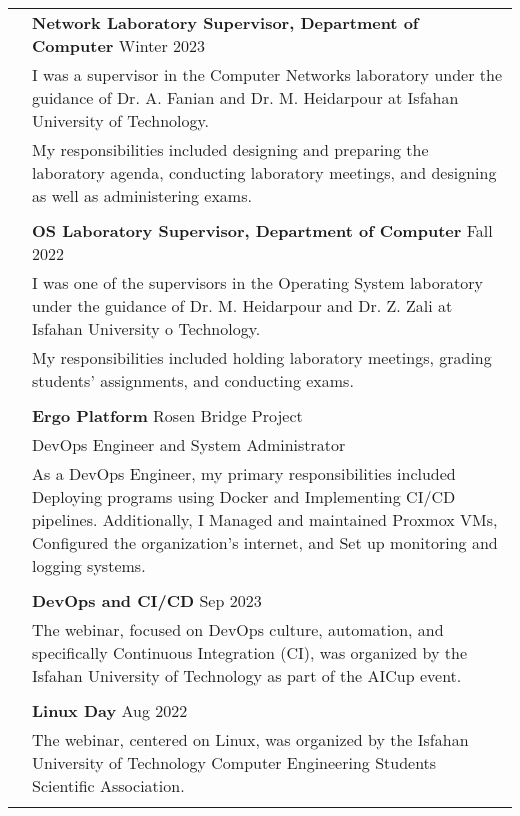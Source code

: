 \documentclass[letterpaper, 11pt]{article}
\begin{document}
\begin{longtable}{p{1.3in}p{4.8in}}
& \textbf{Network Laboratory Supervisor, Department of Computer} \hfill Winter 2023 \\
& I was a supervisor in the Computer Networks laboratory under the guidance of Dr. A. Fanian and Dr. M. Heidarpour at Isfahan University of Technology.\\
& My responsibilities included designing and preparing the laboratory agenda, conducting laboratory meetings, and designing as well as administering exams.\\
& \\

& \textbf{OS Laboratory Supervisor, Department of Computer} \hfill Fall 2022 \\
& I was one of the supervisors in the Operating System laboratory under the guidance of Dr. M. Heidarpour and Dr. Z. Zali at Isfahan University o Technology.\\
& My responsibilities included holding laboratory meetings, grading students' assignments, and conducting exams.\\
& \\


{\color{MidnightBlue}{Industry Experience}} 
& {\textbf{Ergo Platform}} Rosen Bridge Project \hfill \\
& DevOps Engineer and System Administrator \\
& As a DevOps Engineer, my primary responsibilities included Deploying programs using Docker and Implementing CI/CD pipelines. Additionally, I Managed and maintained Proxmox VMs, Configured the organization's internet, and Set up monitoring and logging systems.\\
& \\
 

{\color{MidnightBlue}{Talks and Tutorials}} 
& \textbf{DevOps and CI/CD} \hfill Sep 2023 \\
& The webinar, focused on DevOps culture, automation, and specifically Continuous Integration (CI), was organized by the Isfahan University of Technology as part of the AICup event. \\
& \\

& \textbf{Linux Day} \hfill Aug 2022 \\
& The webinar, centered on Linux, was organized by the Isfahan University of Technology Computer Engineering Students Scientific Association. \\
& \\


\end{longtable}
\end{document}
